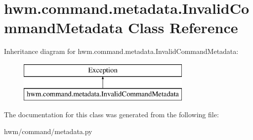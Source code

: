 \hypertarget{classhwm_1_1command_1_1metadata_1_1_invalid_command_metadata}{\section{hwm.\-command.\-metadata.\-Invalid\-Command\-Metadata Class Reference}
\label{classhwm_1_1command_1_1metadata_1_1_invalid_command_metadata}
}
Inheritance diagram for hwm.\-command.\-metadata.\-Invalid\-Command\-Metadata\-:\begin{figure}[H]
\begin{center}
\leavevmode
\includegraphics[height=2.000000cm]{classhwm_1_1command_1_1metadata_1_1_invalid_command_metadata}
\end{center}
\end{figure}


The documentation for this class was generated from the following file\-:\begin{DoxyCompactItemize}
\item 
hwm/command/metadata.\-py\end{DoxyCompactItemize}
